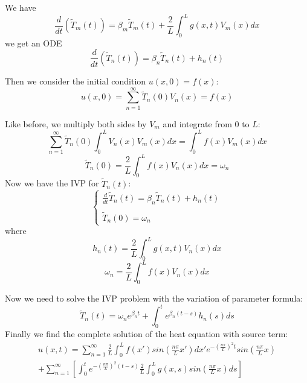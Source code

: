 \documentclass[12pt]{article} %
\begin{document}
We have 
$$
\frac{d}{dt}(\tilde{T}_{m}(t)) = \beta_{m}\tilde{T}_{m}(t) + \frac{2}{L}\int_{0}^{L}g(x, t)V_{m}(x)dx
$$
we get an ODE
$$
\frac{d}{dt}(\tilde{T}_{n}(t)) = \beta_{n}\tilde{T}_{n}(t) +h_{n}(t)
$$\par
Then we consider the initial condition $u(x, 0) = f(x)$:
$$
u(x, 0) = \sum_{n = 1}^{\infty}\tilde{T}_{n}(0) V_{n}(x) = f(x)
$$\par
Like before, we multiply both sides by $V_{m}$ and integrate from 0 to $L$:
$$
\sum_{n=1}^{\infty}\tilde{T}_{n}(0) \int_{0}^{L}V_{n}(x)V_{m}(x)dx = \int_{0}^{L}f(x)V_{m}(x)dx
$$
$$
\tilde{T}_{n}(0) = \frac{2}{L}\int_{0}^{L}f(x)V_{n}(x)dx = \omega_{n}
$$
Now we have the IVP for $\tilde{T}_{n}(t)$:
\begin{equation}
\left\{
\begin{array}{lcc}
\frac{d}{dt}\tilde{T}_{n}(t) = \beta_{n}\tilde{T}_{n}(t) + h_{n}(t) \\
\\
\tilde{T}_{n}(0) =  \omega_{n}
\end{array}\right.
\end{equation}where
$$
h_{n}(t) = \frac{2}{L}\int_{0}^{L}g(x, t)V_{n}(x)dx
$$
$$
\omega_{n} = \frac{2}{L}\int_{0}^{L}f(x)V_{n}(x)dx
$$\par
Now we need to solve the IVP problem with the variation of parameter formula:
$$
\tilde{T}_{n}(t) = \omega_{n}e^{\beta_{n}t} + \int_{0}^{t}e^{\beta_{n}(t-s)}h_{n}(s)ds
$$
Finally we find the complete solution of the heat equation with source term:
\begin{equation}
\begin{multlined}
u(x, t) = \sum_{n = 1}^{\infty} \frac{2}{L}\int_{0}^{L}f(x')sin(\frac{n\pi}{L}x')dx'e^{ - \left(
\frac{n \pi}{L}
\right)^{2}t}sin(\frac{n\pi}{L}x)\\
+
\sum_{n=1}^{\infty}\left[ 
\int_{0}^{t}e^
{- \left(
\frac{n \pi}{L}
\right)^{2}(t-s)
}\frac{2}{L}\int_{0}^{L}g(x, s)sin(\frac{n\pi}{L}x)ds
\right]
\end{multlined}
\end{equation}
\end{document}
